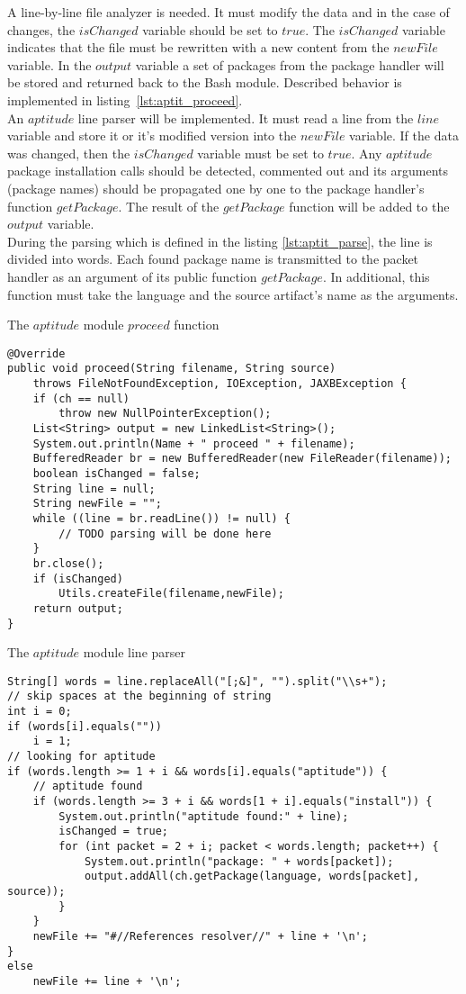 A line-by-line file analyzer is needed.
It must modify the data and in the case of changes, the $isChanged$ variable should be set to $true$.
The $isChanged$ variable indicates that the file must be rewritten with a new content from the $newFile$ variable.
In the $output$ variable a set of packages from the package handler will be stored and returned back to the Bash module.
Described behavior is implemented in listing~\ref{lst:aptit_proceed}.\\
An $aptitude$ line parser will be implemented.
It must read a line from the $line$ variable and store it or it's modified version into the $newFile$ variable.
If the data was changed, then the $isChanged$ variable must be set to $true$.
Any $aptitude$ package installation calls should be detected, commented out and its arguments (package names) should be propagated one by one to the package handler's function $getPackage$. 
The result of the $getPackage$ function will be added to the $output$ variable.\\
During the parsing which is defined in the listing \ref{lst:aptit_parse}, the line is divided into words. 
Each found package name is transmitted to the packet handler as an argument of its public function $getPackage$.
In additional, this function must take the language and the source artifact's name as the arguments.
\begin{Listing} 
\caption{The $aptitude$ module $proceed$ function}
\label{lst:aptit_proceed}
\begin{lstlisting}
@Override
public void proceed(String filename, String source)
	throws FileNotFoundException, IOException, JAXBException {
	if (ch == null)
		throw new NullPointerException();
	List<String> output = new LinkedList<String>();
	System.out.println(Name + " proceed " + filename);
	BufferedReader br = new BufferedReader(new FileReader(filename));
	boolean isChanged = false;
	String line = null;
	String newFile = "";
	while ((line = br.readLine()) != null) {
		// TODO parsing will be done here
	}
	br.close();
	if (isChanged)
		Utils.createFile(filename,newFile);
	return output;
}	 
\end{lstlisting}
\end{Listing} 
\begin{Listing} 
\caption{The $aptitude$ module line parser}
\label{lst:aptit_parse}
\begin{lstlisting}
String[] words = line.replaceAll("[;&]", "").split("\\s+");
// skip spaces at the beginning of string
int i = 0;
if (words[i].equals(""))
	i = 1;
// looking for aptitude 
if (words.length >= 1 + i && words[i].equals("aptitude")) {
	// aptitude found
	if (words.length >= 3 + i && words[1 + i].equals("install")) {
		System.out.println("aptitude found:" + line);
		isChanged = true;
		for (int packet = 2 + i; packet < words.length; packet++) {
			System.out.println("package: " + words[packet]);
			output.addAll(ch.getPackage(language, words[packet], source));
		}
	}
	newFile += "#//References resolver//" + line + '\n';
} 
else
	newFile += line + '\n';
\end{lstlisting}
\end{Listing} 
